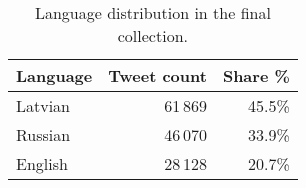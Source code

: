 \begin{table}[h]
  \centering
  \begin{tabular}{lrr}
    \toprule
    Language & Tweet count & Share \% \\
    \midrule
    Latvian     & 61\,869  & 45.5\%  \\
    Russian     & 46\,070  & 33.9\%  \\
    English     & 28\,128  & 20.7\%  \\
    \bottomrule
  \end{tabular}
  \caption{Language distribution in the final collection.}
  \label{tab:language-counts}
\end{table}